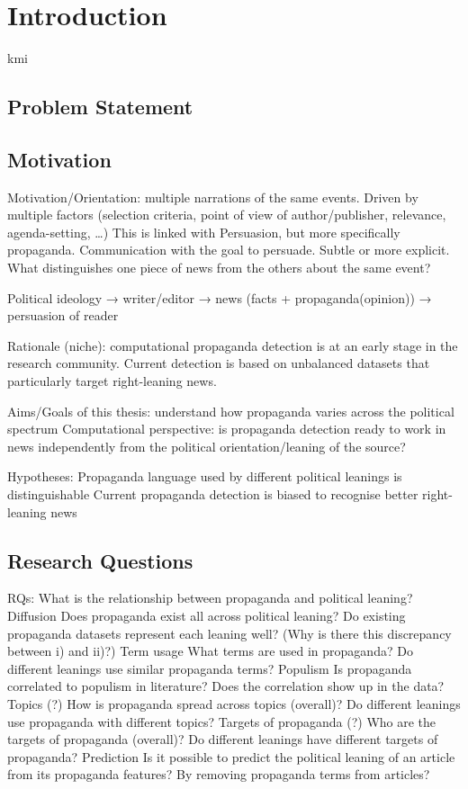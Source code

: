 \chapter{\statusred Introduction}
\acrshort{kmi}

\section{Problem Statement}

\section{Motivation}

Motivation/Orientation: multiple narrations of the same events. Driven by multiple factors (selection criteria, point of view of author/publisher, relevance, agenda-setting, …)
This is linked with Persuasion, but more specifically propaganda. Communication with the goal to persuade. Subtle or more explicit.
What distinguishes one piece of news from the others about the same event? 

Political ideology → writer/editor → news (facts + propaganda(opinion)) → persuasion of reader

Rationale (niche): computational propaganda detection is at an early stage in the research community. Current detection is based on unbalanced datasets that particularly target right-leaning news.

Aims/Goals of this thesis: 
understand how propaganda varies across the political spectrum
Computational perspective: is propaganda detection ready to work in news independently from the political orientation/leaning of the source?

Hypotheses:
Propaganda language used by different political leanings is distinguishable
 Current propaganda detection is biased to recognise better right-leaning news


\section{Research Questions}

RQs:
What is the relationship between propaganda and political leaning?
Diffusion
Does propaganda exist all across political leaning?
Do existing propaganda datasets represent each leaning well?
(Why is there this discrepancy between i) and ii)?)
Term usage
What terms are used in propaganda?
Do different leanings use similar propaganda terms?
Populism
Is propaganda correlated to populism in literature?
Does the correlation show up in the data?
Topics (?)
How is propaganda spread across topics (overall)?
Do different leanings use propaganda with different topics?
Targets of propaganda (?)
Who are the targets of propaganda (overall)?
Do different leanings have different targets of propaganda?
Prediction
Is it possible to predict the political leaning of an article from its propaganda features?
By removing propaganda terms from articles? 


